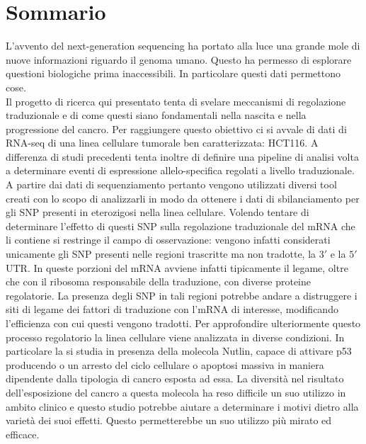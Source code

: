 \chapter*{Sommario} %
\label{sommario}

L'avvento del next-generation sequencing ha portato alla luce una grande mole di nuove informazioni riguardo il genoma umano.
Questo ha permesso di esplorare questioni biologiche prima inaccessibili.
In particolare questi dati permettono cose.\\
Il progetto di ricerca qui presentato tenta di svelare meccanismi di regolazione traduzionale e di come questi siano fondamentali nella nascita e nella progressione del cancro.
Per raggiungere questo obiettivo ci si avvale di dati di RNA-seq di una linea cellulare tumorale ben caratterizzata: HCT116.
A differenza di studi precedenti tenta inoltre di definire una pipeline di analisi volta a determinare eventi di espressione allelo-specifica regolati a livello traduzionale.
A partire dai dati di sequenziamento pertanto vengono utilizzati diversi tool creati con lo scopo di analizzarli in modo da ottenere i dati di sbilanciamento per gli SNP presenti in eterozigosi nella linea cellulare.
Volendo tentare di determinare l'effetto di questi SNP sulla regolazione traduzionale del mRNA che li contiene si restringe il campo di osservazione: vengono infatti considerati unicamente gli SNP presenti nelle regioni trascritte ma non tradotte, la $3'$ e la $5'$ UTR.
In queste porzioni del mRNA avviene infatti tipicamente il legame, oltre che con il ribosoma responsabile della traduzione, con diverse proteine regolatorie.
La presenza degli SNP in tali regioni potrebbe andare a distruggere i siti di legame dei fattori di traduzione con l'mRNA di interesse, modificando l'efficienza con cui questi vengono tradotti.
Per approfondire ulteriormente questo processo regolatorio la linea cellulare viene analizzata in diverse condizioni.
In particolare la si studia in presenza della molecola Nutlin, capace di attivare p53 producendo o un arresto del ciclo cellulare o apoptosi massiva in maniera dipendente dalla tipologia di cancro esposta ad essa.
La diversit\`a nel risultato dell'esposizione del cancro a questa molecola ha reso difficile un suo utilizzo in ambito clinico e questo studio potrebbe aiutare a determinare i motivi dietro alla variet\`a dei suoi effetti.
Questo permetterebbe un suo utilizzo pi\`u mirato ed efficace.\\

